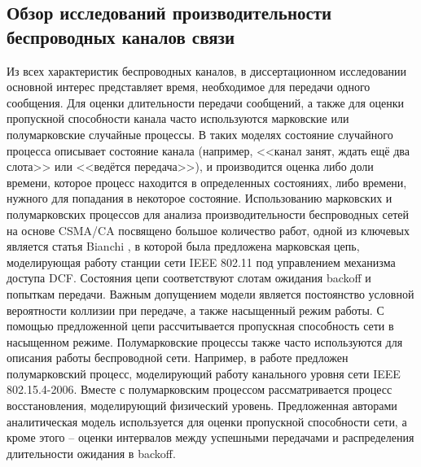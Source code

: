 \subsection{Обзор исследований производительности беспроводных каналов связи}\label{sec:ch1_wifi_observe}

Из всех характеристик беспроводных каналов, в диссертационном исследовании основной интерес представляет время, необходимое для передачи одного сообщения. Для оценки длительности передачи сообщений, а также для оценки пропускной способности канала часто используются марковские или полумарковские случайные процессы. В таких моделях состояние случайного процесса описывает состояние канала (например, <<канал занят, ждать ещё два слота>> или <<ведётся передача>>), и производится оценка либо доли времени, которое процесс находится в определенных состояниях, либо времени, нужного для попадания в некоторое состояние. Использованию марковских и полумарковских процессов для анализа производительности беспроводных сетей на основе CSMA/CA посвящено большое количество работ, одной из ключевых является статья Bianchi \cite{Bianchi2000}, в которой была предложена марковская цепь, моделирующая работу станции сети IEEE 802.11 под управлением механизма доступа DCF. Состояния цепи соответствуют слотам ожидания backoff и попыткам передачи. Важным допущением модели является постоянство условной вероятности коллизии при передаче, а также насыщенный режим работы. С помощью предложенной цепи рассчитывается пропускная способность сети в насыщенном режиме. Полумарковские процессы также часто используются для описания работы беспроводной сети. Например, в работе \cite{Lauwens2010} предложен полумарковский процесс, моделирующий работу канального уровня сети IEEE 802.15.4-2006. Вместе с полумарковским процессом рассматривается процесс восстановления, моделирующий физический уровень. Предложенная авторами аналитическая модель используется для оценки пропускной способности сети, а кроме этого -- оценки интервалов между успешными передачами и распределения длительности ожидания в backoff.

